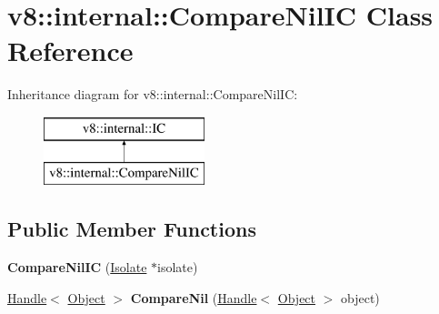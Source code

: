 \hypertarget{classv8_1_1internal_1_1_compare_nil_i_c}{}\section{v8\+:\+:internal\+:\+:Compare\+Nil\+I\+C Class Reference}
\label{classv8_1_1internal_1_1_compare_nil_i_c}
Inheritance diagram for v8\+:\+:internal\+:\+:Compare\+Nil\+I\+C\+:\begin{figure}[H]
\begin{center}
\leavevmode
\includegraphics[height=2.000000cm]{classv8_1_1internal_1_1_compare_nil_i_c}
\end{center}
\end{figure}
\subsection*{Public Member Functions}
\begin{DoxyCompactItemize}
\item 
\hypertarget{classv8_1_1internal_1_1_compare_nil_i_c_a265cfa5a3a2106081e67b23daff45206}{}{\bfseries Compare\+Nil\+I\+C} (\hyperlink{classv8_1_1internal_1_1_isolate}{Isolate} $\ast$isolate)\label{classv8_1_1internal_1_1_compare_nil_i_c_a265cfa5a3a2106081e67b23daff45206}

\item 
\hypertarget{classv8_1_1internal_1_1_compare_nil_i_c_a572f0beca63e8a9c629d30c88027ad12}{}\hyperlink{classv8_1_1internal_1_1_handle}{Handle}$<$ \hyperlink{classv8_1_1internal_1_1_object}{Object} $>$ {\bfseries Compare\+Nil} (\hyperlink{classv8_1_1internal_1_1_handle}{Handle}$<$ \hyperlink{classv8_1_1internal_1_1_object}{Object} $>$ object)\label{classv8_1_1internal_1_1_compare_nil_i_c_a572f0beca63e8a9c629d30c88027ad12}

\end{DoxyCompactItemize}
